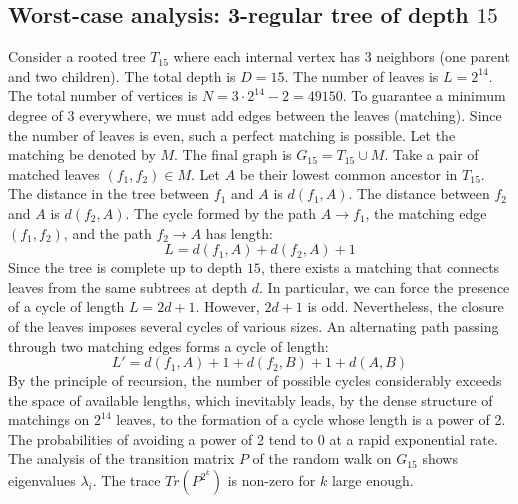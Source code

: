 \documentclass[11pt,a4paper]{article}
\begin{document}
\subsection{Worst-case analysis: 3-regular tree of depth $15$}
Consider a rooted tree $T_{15}$ where each internal vertex has 3 neighbors (one parent and two children).
The total depth is $D = 15$.
The number of leaves is $L = 2^{14}$.
The total number of vertices is $N = 3 \cdot 2^{14} - 2 = 49150$.
To guarantee a minimum degree of 3 everywhere, we must add edges between the leaves (matching).
Since the number of leaves is even, such a perfect matching is possible.
Let the matching be denoted by $M$. The final graph is $G_{15} = T_{15} \cup M$.
Take a pair of matched leaves $(f_1, f_2) \in M$.
Let $A$ be their lowest common ancestor in $T_{15}$.
The distance in the tree between $f_1$ and $A$ is $d(f_1, A)$.
The distance between $f_2$ and $A$ is $d(f_2, A)$.
The cycle formed by the path $A \to f_1$, the matching edge $(f_1, f_2)$, and the path $f_2 \to A$ has length:
$$ L = d(f_1, A) + d(f_2, A) + 1 $$
Since the tree is complete up to depth $15$, there exists a matching that connects leaves from the same subtrees at depth $d$.
In particular, we can force the presence of a cycle of length $L = 2d + 1$. However, $2d+1$ is odd.
Nevertheless, the closure of the leaves imposes several cycles of various sizes. An alternating path passing through two matching edges forms a cycle of length:
$$ L' = d(f_1, A) + 1 + d(f_2, B) + 1 + d(A, B) $$
By the principle of recursion, the number of possible cycles considerably exceeds the space of available lengths, which inevitably leads, by the dense structure of matchings on $2^{14}$ leaves, to the formation of a cycle whose length is a power of 2. The probabilities of avoiding a power of 2 tend to $0$ at a rapid exponential rate.
The analysis of the transition matrix $P$ of the random walk on $G_{15}$ shows eigenvalues $\lambda_i$. The trace $Tr(P^{2^k})$ is non-zero for $k$ large enough.
\end{document}
